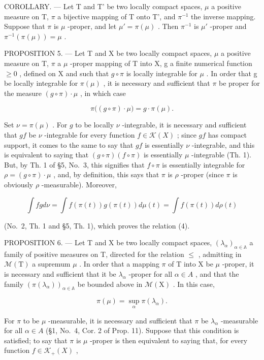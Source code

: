 COROLLARY. --- Let T and T' be two locally compact spaces, \(\mu\) a positive measure on T, \(\pi\) a bijective mapping of T onto T', and \(\pi^{-1}\) the inverse mapping. Suppose that \(\pi\) is \(\mu\) -proper, and let \(\mu' = \pi(\mu)\) . Then \(\pi^{-1}\) is \(\mu'\) -proper and \(\pi^{-1}(\pi(\mu)) = \mu\) .

PROPOSITION 5. --- Let T and X be two locally compact spaces, \(\mu\) a positive measure on T, \(\pi\) a \(\mu\) -proper mapping of T into X, g a finite numerical function \(\geqslant 0\) , defined on X and such that \(g \circ \pi\) is locally integrable for \(\mu\) . In order that g be locally integrable for \(\pi(\mu)\) , it is necessary and sufficient that \(\pi\) be proper for the measure \((g \circ \pi) \cdot \mu\) , in which case

\[
\pi \big ((g \circ \pi) \cdot \mu \big) = g \cdot \pi (\mu).\tag{4}
\]

Set \(\nu = \pi(\mu)\) . For \(g\) to be locally \(\nu\) -integrable, it is necessary and sufficient that \(gf\) be \(\nu\) -integrable for every function \(f \in \mathcal{K}(X)\) ; since \(gf\) has compact support, it comes to the same to say that \(gf\) is essentially \(\nu\) -integrable, and this is equivalent to saying that \((g \circ \pi)(f \circ \pi)\) is essentially \(\mu\) -integrable (Th. 1). But, by Th. 1 of §5, No.~3, this signifies that \(f \circ \pi\) is essentially integrable for \(\rho = (g \circ \pi) \cdot \mu\) , and, by definition, this says that \(\pi\) is \(\rho\) -proper (since \(\pi\) is obviously \(\rho\) -measurable). Moreover,

\[
\int f g d \nu = \int f (\pi (t)) g (\pi (t)) d \mu (t) = \int f (\pi (t)) d \rho (t)
\]

(No.~2, Th. 1 and §5, Th. 1), which proves the relation (4).

PROPOSITION 6. --- Let T and X be two locally compact spaces, \((\lambda_{\alpha})_{\alpha\in\mathbb{A}}\) a family of positive measures on T, directed for the relation \(\leqslant\) , admitting in \(\mathcal{M}(\mathrm{T})\) a supremum \(\mu\) . In order that a mapping \(\pi\) of T into X be \(\mu\) -proper, it is necessary and sufficient that it be \(\lambda_{\alpha}\) -proper for all \(\alpha\in A\) , and that the family \(\left(\pi(\lambda_{\alpha})\right)_{\alpha\in\mathbb{A}}\) be bounded above in \(\mathcal{M}(\mathrm{X})\) . In this case,

\[
\pi (\mu) = \sup _ {\alpha} \pi (\lambda_ {\alpha}).\tag{5}
\]

For \(\pi\) to be \(\mu\) -measurable, it is necessary and sufficient that \(\pi\) be \(\lambda_{\alpha}\) -measurable for all \(\alpha \in A\) (§1, No.~4, Cor. 2 of Prop. 11). Suppose that this condition is satisfied; to say that \(\pi\) is \(\mu\) -proper is then equivalent to saying that, for every function \(f \in \mathcal{K}_{+}(X)\) ,


